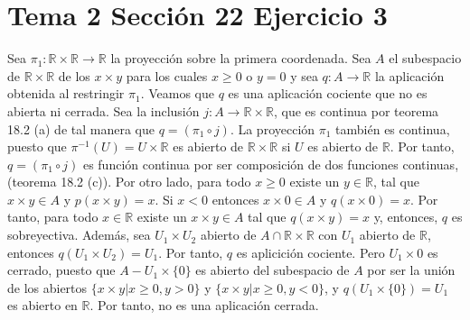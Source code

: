 \documentclass{article}
\begin{document}
\section{Tema 2 Sección 22 Ejercicio 3}
Sea $\pi_1:\mathbb{R}\times \mathbb{R}\rightarrow \mathbb{R}$ la proyección sobre la primera coordenada. Sea $A$ el subespacio de $\mathbb{R}\times \mathbb{R}$ de los $x\times y$ para los cuales $x\geq 0$ o $y=0$ y sea $q:A\rightarrow \mathbb{R}$ la aplicación obtenida al restringir $\pi_1$. Veamos que $q$ es una aplicación cociente que no es abierta ni cerrada. Sea la inclusión $j:A\rightarrow \mathbb{R}\times \mathbb{R}$, que es continua por teorema 18.2 (a) de tal manera que $q=(\pi_1\circ j)$. La proyección $\pi_1$ también es continua, puesto que $\pi^{-1}(U)=U\times \mathbb{R}$ es abierto de $\mathbb{R}\times \mathbb{R}$ si $U$ es abierto de $\mathbb{R}$. Por tanto, $q=(\pi_1\circ j)$ es función continua por ser composición de dos funciones continuas, (teorema 18.2 (c)). Por otro lado, para todo $x\geq 0$ existe un $y\in \mathbb{R}$, tal que $x\times y \in A$ y $p(x\times y)=x$. Si $x<0$ entonces $x\times 0 \in A$ y $q(x\times 0)= x$. Por tanto, para todo $x \in \mathbb{R}$ existe un $x\times y\in A$ tal que $q(x\times y)=x$ y, entonces, $q$ es sobreyectiva. Además, sea  $U_1\times U_2$ abierto de $A\cap \mathbb{R}\times \mathbb{R}$ con $U_1$ abierto de $\mathbb{R}$, entonces $q(U_1 \times U_2)=U_1$. Por tanto, $q$ es aplicición cociente. Pero $U_1\times {0}$ es cerrado, puesto que $A-U_1\times \{0\}$ es abierto del subespacio de $A$ por ser la unión de los abiertos $\{x\times y | x\geq 0, y>0\}$ y $\{x\times y | x\geq 0, y<0\}$, y $q(U_1 \times \{0\})=U_1$ es abierto en $\mathbb{R}$. Por tanto, no es una aplicación cerrada.
\end{document}
